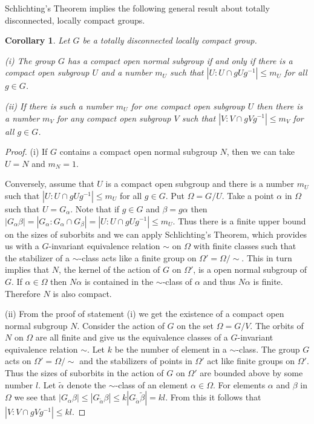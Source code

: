 \documentclass{emsprocart}
\newtheorem{corollary}[theorem]{Corollary}
\theoremstyle{definition}
\begin{document}
\bigskip
Schlichting's Theorem implies the following general result about
totally disconnected, locally compact groups.

\begin{corollary}  Let $G$ be a totally disconnected locally compact group.

(i)  The group $G$ has a compact open normal subgroup if and only if
  there is a compact open subgroup $U$ and a number $m_U$ such that
$|U:U\cap gUg^{-1}|\leq m_U$ for all $g\in G$.

(ii) If there is such a number $m_U$ for one compact open subgroup
  $U$ then there is a number $m_V$ for any compact open subgroup
  $V$ such that  $|V:V\cap gVg^{-1}|\leq m_V$ for all $g\in G$.
\end{corollary}

\begin{proof}  (i) If $G$ contains a compact open normal subgroup $N$, then
 we can take $U=N$ and
$m_N=1$.

Conversely, assume that $U$ is a compact open subgroup and there is a number
$m_U$ such that $|U:U\cap gUg^{-1}|\leq m_U$ for all $g \in G$.
Put $\Omega=G/U$.  Take a point $\alpha$ in $\Omega$
such that $U=G_\alpha$.  Note that if $g\in G$ and $\beta=g\alpha$
then $|G_\alpha\beta|=|G_\alpha:G_\alpha\cap G_\beta|=|U:U\cap
gUg^{-1}|\leq m_U$.  Thus there is a finite upper bound on the sizes of
suborbits and we can apply Schlichting's Theorem, which
    provides  us with a
$G$-invariant equivalence relation $\sim$ on $\Omega$ with finite classes
such that the stabilizer of a $\sim$-class acts like a finite group
on $\Omega'=\Omega/\sim$.  This in turn implies that $N$, the kernel
of the action of $G$ on $\Omega'$, is a open normal subgroup of $G$.
If $\alpha\in \Omega$ then $N\alpha$ is contained in the $\sim$-class
of $\alpha$ and thus $N\alpha$ is finite.  Therefore $N$ is also
compact.

(ii)  From the proof of statement (i) we get the existence of a compact open normal
subgroup $N$.  Consider the action of $G$ on the set $\Omega=G/V$.  The
orbits of $N$ on $\Omega$ are all finite and give us the equivalence
classes of a $G$-invariant equivalence relation $\sim$.  Let $k$ be the
number of element in a $\sim$-class.  The group $G$
acts on $\Omega'=\Omega/\sim$ and the stabilizers of points in
$\Omega'$ act like finite groups on $\Omega'$.  Thus the sizes of
suborbits in the action of $G$ on $\Omega'$ are bounded above by some
number $l$.  Let $\tilde{\alpha}$
denote the $\sim$-class of an element $\alpha\in\Omega$.  For
elements $\alpha$ and $\beta$ in $\Omega$ we see that
$|G_\alpha\beta|\leq |G_{\tilde{\alpha}}\beta|\leq
k|G_{\tilde{\alpha}}\tilde{\beta}|=kl$.   From this it follows that
 $|V:V\cap gVg^{-1}|\leq kl$.  \end{proof}
\end{document}
